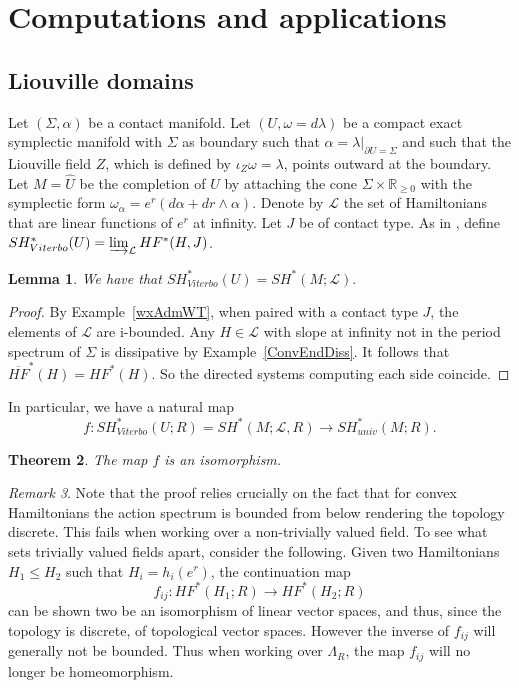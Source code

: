 \documentclass[11pt]{amsart}
\newcommand{\R}{\mathbb{R}}
\newtheorem{tm}{Theorem}[section]
\newtheorem{lm}[tm]{Lemma}
\theoremstyle{definition}
\theoremstyle{remark}
\newtheorem{rem}[tm]{Remark}
\begin{document}
\section{Computations and applications}\label{Sec7}
\subsection{Liouville domains}\label{subSecLiouville}
Let $(\Sigma,\alpha)$ be a contact manifold. Let $(U,\omega=d\lambda)$ be a compact exact symplectic manifold with $\Sigma$ as boundary such that $\alpha=\lambda|_{\partial U=\Sigma}$ and such that the Liouville field $Z$, which is defined by $\iota_Z\omega =\lambda$,  points outward at the boundary.  Let $M=\hat{U}$ be the completion of $U$ by attaching the cone $\Sigma\times\R_{\geq0}$ with the symplectic form $\omega_{\alpha}=e^r(d\alpha+dr\wedge\alpha )$. Denote by $\mathcal{L}$ the set of Hamiltonians that are linear functions of $e^r$ at infinity. Let $J$ be of contact type. As in \cite{Viterbo99}, define $SH^*_{Viterbo}(U)=\varinjlim_{\mathcal{L}}HF^*(H,J)$.
\begin{lm}
We have that $SH^*_{Viterbo}(U)=SH^*(M;\mathcal{L}).$
\end{lm}
\begin{proof}
 By Example~\ref{wxAdmWT}, when paired with a contact type $J$, the elements of $\mathcal{L}$ are i-bounded. Any $H\in\mathcal{L}$ with slope at infinity not in the period spectrum of $\Sigma$ is dissipative by Example~\ref{ConvEndDiss}. It follows that $\overline{HF}^*(H)=HF^*(H)$. So the directed systems computing each side coincide.
 \end{proof}
 In particular, we have a natural map
\[
f:SH^*_{Viterbo}(U;R)=SH^*(M;\mathcal{L},R)\to SH^*_{univ}(M;R).
\]
\begin{tm}\label{VitUnivEmb}
The map $f$ is an isomorphism.
\end{tm}
\begin{rem}\label{rmTrivNonTriv}
Note that the proof relies crucially on the fact that for convex Hamiltonians the action spectrum is bounded from below rendering the topology discrete. This fails when working over a non-trivially valued field. To see what sets trivially valued fields apart, consider the following. Given two Hamiltonians $H_1\leq H_2$ such that $H_i=h_i(e^r)$, the continuation map
\[
f_{ij}:HF^*(H_1;R)\to HF^*(H_2;R)
\]
can be shown two be an isomorphism of linear vector spaces, and thus, since the topology is discrete, of topological vector spaces. However the inverse of $f_{ij}$ will generally not be bounded. Thus when working over $\Lambda_R$, the map $f_{ij}$ will no longer be homeomorphism.
\end{rem}
\end{document}
